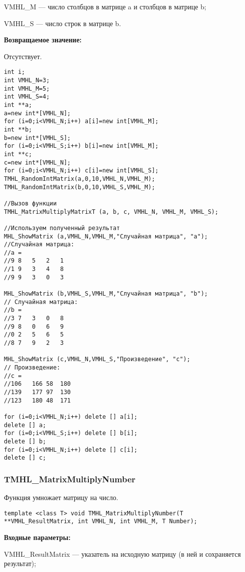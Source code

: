 \documentclass[a4paper,12pt]{article}
\begin{document}
VMHL\_M --- число столбцов в матрице a и столбцов в матрице b;
 
VMHL\_S --- число строк в матрице b.

\textbf{Возвращаемое значение:}

Отсутствует.


\begin{lstlisting}[label=code_use_TMHL_MatrixMultiplyMatrixT,caption=Пример использования]
int i;
int VMHL_N=3;
int VMHL_M=5;
int VMHL_S=4;
int **a;
a=new int*[VMHL_N];
for (i=0;i<VMHL_N;i++) a[i]=new int[VMHL_M];
int **b;
b=new int*[VMHL_S];
for (i=0;i<VMHL_S;i++) b[i]=new int[VMHL_M];
int **c;
c=new int*[VMHL_N];
for (i=0;i<VMHL_N;i++) c[i]=new int[VMHL_S];
TMHL_RandomIntMatrix(a,0,10,VMHL_N,VMHL_M);
TMHL_RandomIntMatrix(b,0,10,VMHL_S,VMHL_M);

//Вызов функции
TMHL_MatrixMultiplyMatrixT (a, b, c, VMHL_N, VMHL_M, VMHL_S);

//Используем полученный результат
MHL_ShowMatrix (a,VMHL_N,VMHL_M,"Случайная матрица", "a");
//Случайная матрица:
//a =
//9	8	5	2	1
//1	9	3	4	8
//9	9	3	0	3

MHL_ShowMatrix (b,VMHL_S,VMHL_M,"Случайная матрица", "b");
// Случайная матрица:
//b =
//3	7	3	0	8
//9	8	0	6	9
//0	2	5	6	5
//8	7	9	2	3

MHL_ShowMatrix (c,VMHL_N,VMHL_S,"Произведение", "c");
// Произведение:
//c =
//106	166	58	180
//139	177	97	130
//123	180	48	171

for (i=0;i<VMHL_N;i++) delete [] a[i];
delete [] a;
for (i=0;i<VMHL_S;i++) delete [] b[i];
delete [] b;
for (i=0;i<VMHL_N;i++) delete [] c[i];
delete [] c;
\end{lstlisting}

\subsubsection{TMHL\_MatrixMultiplyNumber}\label{TMHL_MatrixMultiplyNumber}

Функция умножает матрицу на число.


\begin{lstlisting}[label=code_syntax_TMHL_MatrixMultiplyNumber,caption=Синтаксис]
template <class T> void TMHL_MatrixMultiplyNumber(T **VMHL_ResultMatrix, int VMHL_N, int VMHL_M, T Number);
\end{lstlisting}

\textbf{Входные параметры:}

 VMHL\_ResultMatrix --- указатель на исходную матрицу (в ней и сохраняется результат);
 
\end{document}
